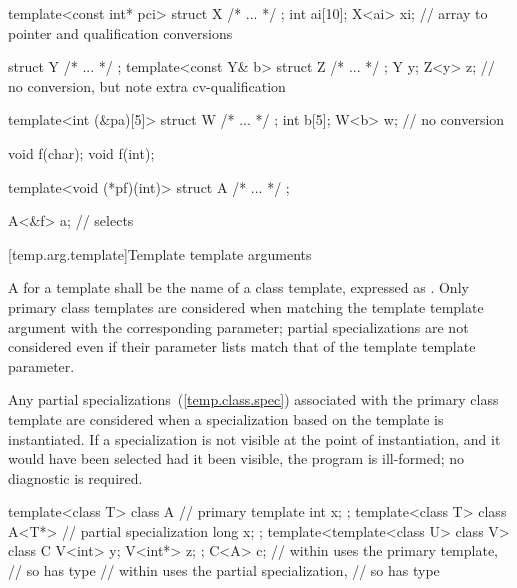\enterexample
\begin{codeblock}
template<const int* pci> struct X { /* ... */ };
int ai[10];
X<ai> xi;                       // array to pointer and qualification conversions

struct Y { /* ... */ };
template<const Y& b> struct Z { /* ... */ };
Y y;
Z<y> z;                         // no conversion, but note extra cv-qualification

template<int (&pa)[5]> struct W { /* ... */ };
int b[5];
W<b> w;                         // no conversion

void f(char);
void f(int);

template<void (*pf)(int)> struct A { /* ... */ };

A<&f> a;                        // selects 
\end{codeblock}
\exitexampleb

[temp.arg.template]{Template template arguments}

\pnum
A
for a template
shall be the name of a class template, expressed as
.
Only primary class templates are considered when matching the template template
argument with the corresponding parameter; partial specializations are not
considered even if their parameter lists match that of the template template
parameter.

\pnum
Any partial specializations~(\ref{temp.class.spec}) associated with the
primary class template are considered when a specialization based on the
template
is instantiated.
If a specialization is not visible at the point of instantiation,
and it would have been selected had it been visible, the program is ill-formed;
no diagnostic is required.
\enterexample

\begin{codeblock}
template<class T> class A {     // primary template
	int x;
};
template<class T> class A<T*> { // partial specialization
	long x;
};
template<template<class U> class V> class C {
	V<int>  y;
	V<int*> z;
};
C<A> c;                         //  within  uses the primary template,
                                // so  has type 
                                //  within  uses the partial specialization,
                                // so  has type 
\end{codeblock}
\exitexampleb

